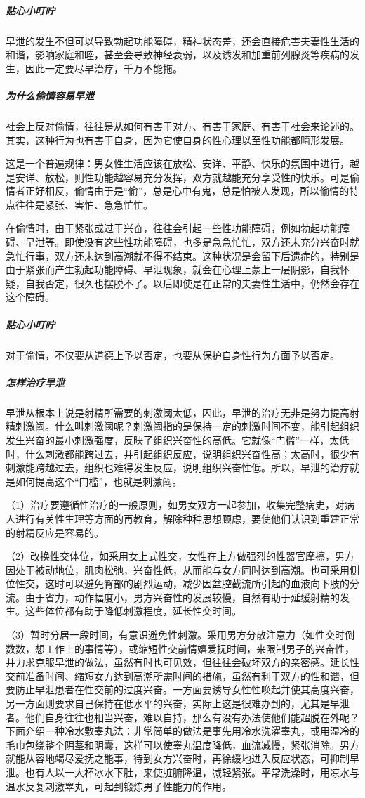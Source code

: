 \subparagraph{贴心小叮咛}

早泄的发生不但可以导致勃起功能障碍，精神状态差，还会直接危害夫妻性生活的和谐，影响家庭和睦，甚至会导致神经衰弱，以及诱发和加重前列腺炎等疾病的发生，因此一定要尽早治疗，千万不能拖。

\subparagraph{为什么偷情容易早泄}

社会上反对偷情，往往是从如何有害于对方、有害于家庭、有害于社会来论述的。其实，这种行为也有害于自身，因为它使自身的性心理以至性功能都畸形发展。

这是一个普遍规律：男女性生活应该在放松、安详、平静、快乐的氛围中进行，越是安详、放松，则性功能越容易充分发挥，双方就越能充分享受性的快乐。可是偷情者正好相反，偷情由于是“偷”，总是心中有鬼，总是怕被人发现，所以偷情的特点往往是紧张、害怕、急急忙忙。

在偷情时，由于紧张或过于兴奋，往往会引起一些性功能障碍，例如勃起功能障碍、早泄等。即使没有这些性功能障碍，也多是急急忙忙，双方还未充分兴奋时就急忙行事，双方还未达到高潮就不得不结束。这种状况是会留下后遗症的，特别是由于紧张而产生勃起功能障碍、早泄现象，就会在心理上蒙上一层阴影，自我怀疑，自我否定，很久也摆脱不了。以后即使是在正常的夫妻性生活中，仍然会存在这个障碍。

\subparagraph{贴心小叮咛}

对于偷情，不仅要从道德上予以否定，也要从保护自身性行为方面予以否定。

\subparagraph{怎样治疗早泄}

早泄从根本上说是射精所需要的刺激阈太低，因此，早泄的治疗无非是努力提高射精刺激阈。什么叫刺激阈呢？刺激阈指的是保持一定的刺激时间不变，能引起组织发生兴奋的最小刺激强度，反映了组织兴奋性的高低。它就像“门槛”一样，太低时，什么刺激都能跨过去，并引起组织反应，说明组织兴奋性高；太高时，很少有刺激能跨越过去，组织也难得发生反应，说明组织兴奋性低。所以，早泄的治疗就是如何提高这个“门槛”，也就是刺激阈。

（1）治疗要遵循性治疗的一般原则，如男女双方一起参加，收集完整病史，对病人进行有关性生理等方面的再教育，解除种种思想顾虑，要使他们认识到重建正常的射精反应是容易的。

（2）改换性交体位，如采用女上式性交，女性在上方做强烈的性器官摩擦，男方因处于被动地位，肌肉松弛，兴奋性低，从而能与女方同时达到高潮。也可采用侧位性交，这时可以避免臀部的剧烈运动，减少因盆腔截流所引起的血液向下肢的分流。由于省力，动作幅度小，男方兴奋性的发展较慢，自然有助于延缓射精的发生。这些体位都有助于降低刺激程度，延长性交时间。

（3）暂时分居一段时间，有意识避免性刺激。采用男方分散注意力（如性交时倒数数，想工作上的事情等），或缩短性交前情嬉爱抚时间，来限制男子的兴奋性，并力求克服早泄的做法，虽然有时也可见效，但往往会破坏双方的亲密感。延长性交前准备时间、缩短女方达到高潮所需时间的措施，虽然有利于双方的性和谐，但要防止早泄患者在性交前的过度兴奋。一方面要诱导女性性唤起并使其高度兴奋，另一方面则要求自己保持在低水平的兴奋，实际上这是很难办到的，尤其是早泄者。他们自身往往也相当兴奋，难以自持，那么有没有办法使他们能超脱在外呢？下面介绍一种冷水敷睾丸法：非常简单的做法是事先用冷水洗濯睾丸，或用湿冷的毛巾包绕整个阴茎和阴囊，这样可以使睾丸温度降低，血流减慢，紧张消除。男方就能从容地竭尽爱抚之能事，待到女方兴奋时，再徐缓地进入反应状态，可抑制早泄。也有人以一大杯冰水下肚，来使脏腑降温，减轻紧张。平常洗澡时，用凉水与温水反复刺激睾丸，可起到锻炼男子性能力的作用。

